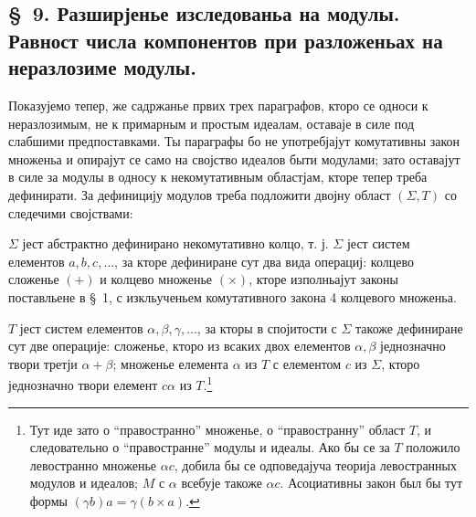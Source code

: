 ﻿\documentclass[11pt]{article}
\begin{document}

\setcounter{footnote}{33}
\subsection*{\S~9. Разширјенье изследованьа на модулы. Равност числа компонентов при разложеньах на неразлозиме модулы.}

Показујемо тепер, же садржанье првих трех параграфов, кторо се односи к неразлозимым, не к примарным и простым идеалам, оставаје в силе под слабшими предпоставками. Ты параграфы бо не употребјајут комутативны закон множеньа и опирајут се само на својство идеалов быти модулами; зато оставајут в силе за модулы в односу к некомутативным областјам, кторе тепер треба дефинирати. За дефиницију модулов треба подложити двојну област \((\Sigma,T)\) со следечими својствами:

\(\Sigma\) јест абстрактно дефинирано некомутативно колцо, т. ј. \(\Sigma\) јест систем елементов \(a,b,c,\ldots\), за кторе дефиниране сут два вида операциј: колцево сложенье \((+)\) и колцево множенье \((\times)\), кторе изполньајут законы поставльене в \S~1, с изкльученьем комутативного закона 4 колцевого множеньа.

\(T\) јест систем елементов \(\alpha,\beta,\gamma,\ldots\), за кторы в спојитости с \(\Sigma\) такоже дефиниране сут две операције: сложенье, кторо из всаких двох елементов \(\alpha,\beta\) једнозначно твори третји \(\alpha+\beta\); множенье елемента \(\alpha\) из \(T\) с елементом \(c\) из \(\Sigma\), кторо једнозначно твори елемент \(c\alpha\) из \(T\).\footnote{Тут иде зато о ``правостранно'' множенье, о ``правостранну'' област \(T\), и следовательно о ``правостранне'' модулы и идеалы. Ако бы се за \(T\) положило левостранно множенье \(\alpha c\), добила бы се одповедајуча теорија левостранных модулов и идеалов; \(M\) с \(\alpha\) всебује такоже \(\alpha c\). Асоциативны закон был бы тут формы \((\gamma b)a=\gamma(b\times a)\).}
\end{document}
